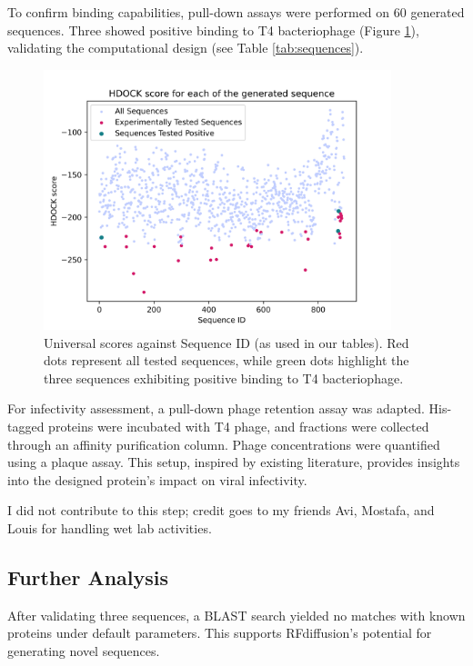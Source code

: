 \documentclass[11pt,a4paper]{article}
\begin{document}
To confirm binding capabilities, pull-down assays were performed on 60 generated sequences. Three showed positive binding to T4 bacteriophage (Figure \ref{fig:universal_score}), validating the computational design (see Table \ref{tab:sequences}). 

\begin{figure}[ht]
    \centering
    \includegraphics[width=0.9\textwidth]{Figures/universal_score_against_Sequence_Global_ID.png}
    \caption{Universal scores against Sequence ID (as used in our tables). Red dots represent all tested sequences, while green dots highlight the three sequences exhibiting positive binding to T4 bacteriophage.}
    \label{fig:universal_score}
\end{figure}

For infectivity assessment, a pull-down phage retention assay was adapted. His-tagged proteins were incubated with T4 phage, and fractions were collected through an affinity purification column. Phage concentrations were quantified using a plaque assay. This setup, inspired by existing literature, provides insights into the designed protein's impact on viral infectivity.

I did not contribute to this step; credit goes to my friends Avi, Mostafa, and Louis for handling wet lab activities.

\subsection{Further Analysis}

After validating three sequences, a BLAST search yielded no matches with known proteins under default parameters. This supports RFdiffusion's potential for generating novel sequences.
\end{document}

